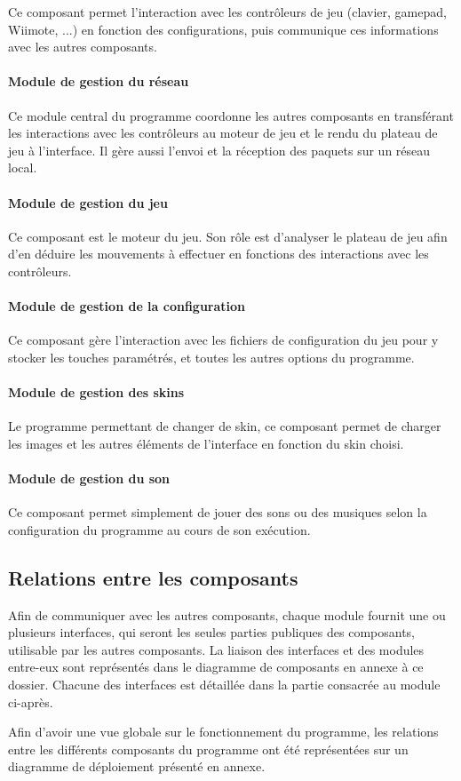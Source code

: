 Ce composant permet l'interaction avec les contrôleurs de jeu (clavier, gamepad, Wiimote, ...) en fonction des configurations, puis communique ces informations avec les autres composants.

\paragraph{Module de gestion du réseau}

Ce module central du programme coordonne les autres composants en transférant les interactions avec les contrôleurs au moteur de jeu et le rendu du plateau de jeu à l'interface. Il gère aussi l'envoi et la réception des paquets sur un réseau local.

\paragraph{Module de gestion du jeu}

Ce composant est le moteur du jeu. Son rôle est d'analyser le plateau de jeu afin d'en déduire les mouvements à effectuer en fonctions des interactions avec les contrôleurs.

\paragraph{Module de gestion de la configuration}

Ce composant gère l'interaction avec les fichiers de configuration du jeu pour y stocker les touches paramétrés, et toutes les autres options du programme.

\paragraph{Module de gestion des skins}

Le programme permettant de changer de skin, ce composant permet de charger les images et les autres éléments de l'interface en fonction du skin choisi.

\paragraph{Module de gestion du son}

Ce composant permet simplement de jouer des sons ou des musiques selon la configuration du programme au cours de son exécution.

\subsection{Relations entre les composants}

Afin de communiquer avec les autres composants, chaque module fournit une ou plusieurs interfaces, qui seront les seules parties publiques des composants, utilisable par les autres composants. La liaison des interfaces et des modules entre-eux sont représentés dans le diagramme de composants en annexe à ce dossier. Chacune des interfaces est détaillée dans la partie consacrée au module ci-après.

Afin d'avoir une vue globale sur le fonctionnement du programme, les relations entre les différents composants du programme ont été représentées sur un diagramme de déploiement présenté en annexe.